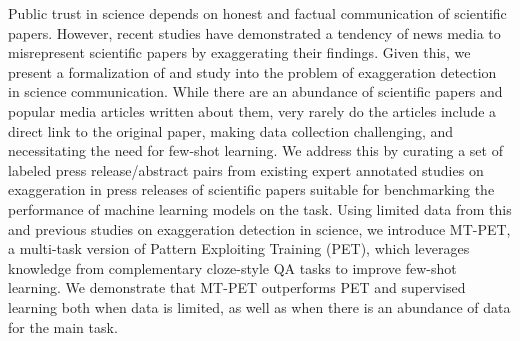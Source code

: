 Public trust in science depends on honest and factual communication of scientific papers. However, recent studies have demonstrated a tendency of news media to misrepresent scientific papers by exaggerating their findings. Given this, we present a formalization of and study into the problem of exaggeration detection in science communication. While there are an abundance of scientific papers and popular media articles written about them, very rarely do the articles include a direct link to the original paper, making data collection challenging, and necessitating the need for few-shot learning. We address this by curating a set of labeled press release/abstract pairs from existing expert annotated studies on exaggeration in press releases of scientific papers suitable for benchmarking the performance of machine learning models on the task. Using limited data from this and previous studies on exaggeration detection in science, we introduce MT-PET, a multi-task version of Pattern Exploiting Training (PET), which leverages knowledge from complementary cloze-style QA tasks to improve few-shot learning. We demonstrate that MT-PET outperforms PET and supervised learning both when data is limited, as well as when there is an abundance of data for the main task.
